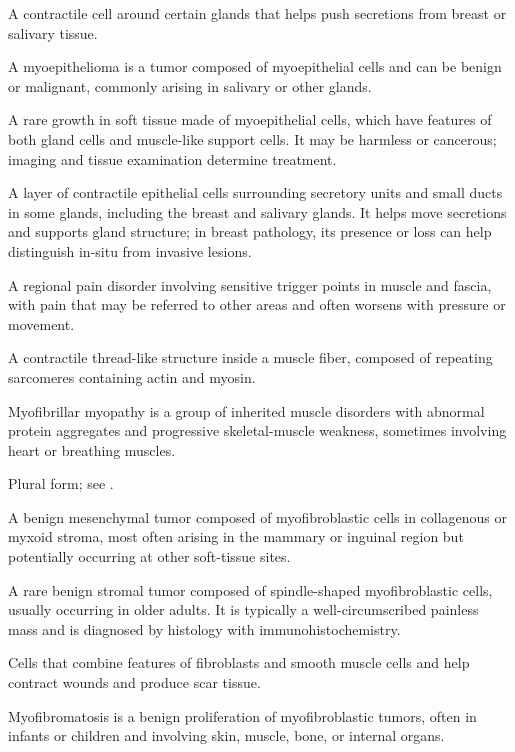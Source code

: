  A contractile cell around certain glands that helps push secretions from breast or salivary tissue.

 A myoepithelioma is a tumor composed of myoepithelial cells and can be benign or malignant, commonly arising in salivary or other glands.

 A rare growth in soft tissue made of myoepithelial cells, which have features of both gland cells and muscle-like support cells. It may be harmless or cancerous; imaging and tissue examination determine treatment.

 A layer of contractile epithelial cells surrounding secretory units and small ducts in some glands, including the breast and salivary glands. It helps move secretions and supports gland structure; in breast pathology, its presence or loss can help distinguish in-situ from invasive lesions.

 A regional pain disorder involving sensitive trigger points in muscle and fascia, with pain that may be referred to other areas and often worsens with pressure or movement.

 A contractile thread-like structure inside a muscle fiber, composed of repeating sarcomeres containing actin and myosin.

 Myofibrillar myopathy is a group of inherited muscle disorders with abnormal protein aggregates and progressive skeletal-muscle weakness, sometimes involving heart or breathing muscles.

 Plural form; see .

 A benign mesenchymal tumor composed of myofibroblastic cells in collagenous or myxoid stroma, most often arising in the mammary or inguinal region but potentially occurring at other soft-tissue sites.

 A rare benign stromal tumor composed of spindle-shaped myofibroblastic cells, usually occurring in older adults. It is typically a well-circumscribed painless mass and is diagnosed by histology with immunohistochemistry.

 Cells that combine features of fibroblasts and smooth muscle cells and help contract wounds and produce scar tissue.

 Myofibromatosis is a benign proliferation of myofibroblastic tumors, often in infants or children and involving skin, muscle, bone, or internal organs.

